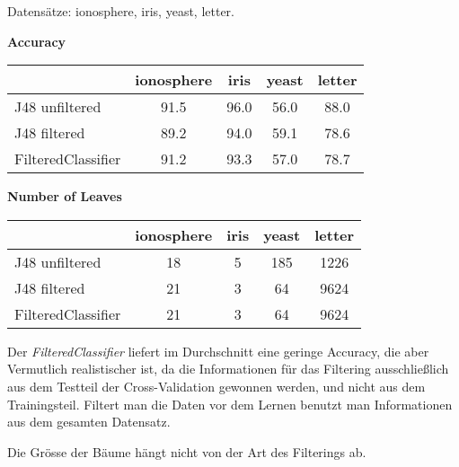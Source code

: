 Datens\"atze: ionosphere, iris, yeast, letter.

\textbf{Accuracy}

\begin{table}[htb]
	\centering
\begin{tabular}{l|c|c|c|c}
	               & ionosphere & iris  & yeast & letter \\ \hline
J48 unfiltered     &  91.5      &  96.0 &  56.0 &  88.0  \\ \hline
J48 filtered       &  89.2      &  94.0 &  59.1 &  78.6  \\ \hline
FilteredClassifier &  91.2      &  93.3 &  57.0 &  78.7 
\end{tabular}
\end{table}
\textbf{Number of Leaves}

\begin{table}[htb]
	\centering
\begin{tabular}{l|c|c|c|c}
	               & ionosphere & iris  & yeast & letter \\ \hline
J48 unfiltered     &  18        &  5    &  185  &  1226  \\ \hline
J48 filtered       &  21        &  3    &  64   &  9624  \\ \hline
FilteredClassifier &  21        &  3    &  64   &  9624 
\end{tabular}
\end{table}

Der \emph{FilteredClassifier} liefert im Durchschnitt eine geringe Accuracy, die aber Vermutlich realistischer ist, da die Informationen f\"ur das Filtering ausschlie\ss lich aus dem Testteil der Cross-Validation gewonnen werden, und nicht aus dem Trainingsteil. Filtert man die Daten vor dem Lernen benutzt man Informationen aus dem gesamten Datensatz. 

Die Gr\" osse der B\"aume h\"angt nicht von der Art des Filterings ab.

